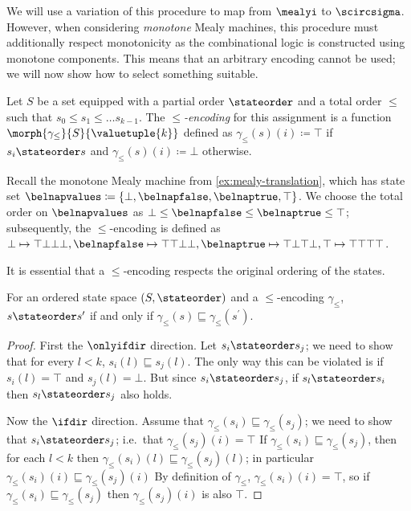 We will use a variation of this procedure to map from \(\mealyi\) to
\(\scircsigma\).
However, when considering \emph{monotone} Mealy machines, this procedure must
additionally respect monotonicity as the combinational logic is constructed
using monotone components.
This means that an arbitrary encoding cannot be used; we will now show how to
select something suitable.

\begin{definition}[Encoding]\label{def:encoding}
    Let \(S\) be a set equipped with a partial order \(\stateorder\) and a total
    order \(\leq\) such that \(s_0 \leq s_1 \leq \dots s_{k-1}\).
    The \emph{\(\leq\)-encoding} for this assignment is a function
    \(\morph{\gamma_\leq}{S}{\valuetuple{k}}\) defined as
    \(\gamma_\leq(s)(i) \coloneqq \top\) if \(s_i \stateorder s\) and
    \(\gamma_\leq(s)(i) \coloneqq \bot\) otherwise.
\end{definition}

\begin{example}
    Recall the monotone Mealy machine from \cref{ex:mealy-translation}, which
    has state set \(
    \belnapvalues \coloneqq \{\bot,\belnapfalse,\belnaptrue,\top\}
    \).
    We choose the total order on \(\belnapvalues\) as
    \(\bot \leq \belnapfalse \leq \belnaptrue \leq \top\); subsequently, the
    \(\leq\)-encoding is defined as \(
    \bot \mapsto \top\bot\bot\bot, \belnapfalse \mapsto \top\top\bot\bot,
    \belnaptrue \mapsto \top\bot\top\bot, \top \mapsto \top\top\top\top
    \).
\end{example}

It is essential that a \(\leq\)-encoding respects the original ordering of the
states.

\begin{lemma}
    For an ordered state space \((S,\stateorder)\) and a \(\leq\)-encoding
    \(\gamma_\leq\), \(s \stateorder s^\prime\) if and only if
    \(\gamma_\leq(s) \sqsubseteq \gamma_\leq(s^\prime)\).
\end{lemma}
\begin{proof}
    First the \(\onlyifdir\) direction.
    Let \(s_i \stateorder s_j\); we need to show that for every \(l < k\),
    \(s_i(l) \sqsubseteq s_j(l)\).
    The only way this can be violated is if \(s_i(l) = \top\) and
    \(s_j(l) = \bot\).
    But since \(s_i \stateorder s_j\), if \(s_l \stateorder s_i\) then
    \(s_l \stateorder s_j\) also holds.

    Now the \(\ifdir\) direction.
    Assume that \(\gamma_\leq(s_i) \sqsubseteq \gamma_\leq(s_j)\); we need to
    show that \(s_i \stateorder s_j\); i.e.\ that \(\gamma_\leq(s_j)(i) = \top\)
    If \(\gamma_\leq(s_i) \sqsubseteq \gamma_\leq(s_j)\), then for each
    \(l < k\) then \(\gamma_\leq(s_i)(l) \sqsubseteq \gamma_\leq(s_j)(l)\);
    in particular \(\gamma_\leq(s_i)(i) \sqsubseteq \gamma_\leq(s_j)(i)\)
    By definition of \(\gamma_\leq\), \(\gamma_\leq(s_i)(i) = \top\), so if
    \(\gamma_\leq(s_i) \sqsubseteq \gamma_\leq(s_j)\) then
    \(\gamma_\leq(s_j)(i)\) is also \(\top\).
\end{proof}

